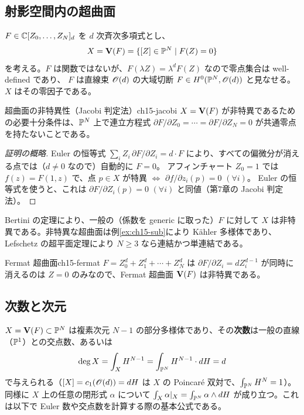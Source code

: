 \subsection{射影空間内の超曲面}

$F\in\mathbb{C}[Z_0,\dots,Z_N]_d$ を $d$ 次斉次多項式とし、
\[
X = \mathbf{V}(F) = \{[Z]\in\mathbb{P}^N\mid F(Z) = 0\}
\]
を考える。$F$ は関数ではないが、$F(\lambda Z) = \lambda^dF(Z)$ なので零点集合は well-defined であり、
$F$ は直線束 $\mathscr{O}(d)$ の大域切断 $F\in H^0(\mathbb{P}^N,\mathscr{O}(d))$ と見なせる。$X$ はその零因子である。

\begin{myprop}{超曲面の非特異性（Jacobi 判定法）}{ch15-jacobi}
$X = \mathbf{V}(F)$ が非特異であるための必要十分条件は、$\mathbb{P}^N$ 上で連立方程式
$\partial F/\partial Z_0 = \cdots = \partial F/\partial Z_N = 0$ が共通零点を持たないことである。
\end{myprop}

\begin{proof}[証明の概略]
Euler の恒等式 $\sum_iZ_i\,\partial F/\partial Z_i = d\cdot F$ により、すべての偏微分が消える点では（$d\neq0$ なので）自動的に $F=0$。
アフィンチャート $Z_0 = 1$ では $f(z) = F(1,z)$ で、点 $p\in X$ が特異 $\Leftrightarrow$ $\partial f/\partial z_i(p) = 0$ $(\forall i)$。
Euler の恒等式を使うと、これは $\partial F/\partial Z_i(p) = 0$ $(\forall i)$ と同値（第7章の Jacobi 判定法）。
\end{proof}

Bertini の定理により、一般の（係数を generic に取った）$F$ に対して $X$ は非特異である。非特異な超曲面は例\ref{ex:ch15-sub}により K\"ahler 多様体であり、
Lefschetz の超平面定理により $N\geq 3$ なら連結かつ単連結である。

\begin{myex}{Fermat 超曲面}{ch15-fermat}
$F = Z_0^d + Z_1^d + \cdots + Z_N^d$ は $\partial F/\partial Z_i = dZ_i^{d-1}$ が同時に消えるのは $Z=0$ のみなので、Fermat 超曲面 $\mathbf{V}(F)$ は非特異である。
\end{myex}

\subsection{次数と次元}

$X = \mathbf{V}(F)\subset\mathbb{P}^N$ は複素次元 $N-1$ の部分多様体であり、その\textbf{次数}は一般の直線（$\mathbb{P}^1$）との交点数、あるいは
\[
\deg X = \int_X H^{N-1} = \int_{\mathbb{P}^N}H^{N-1}\cdot dH = d
\]
で与えられる（$[X] = c_1(\mathscr{O}(d)) = dH$ は $X$ の Poincar\'e 双対で、$\int_{\mathbb{P}^N}H^N = 1$）。
同様に $X$ 上の任意の閉形式 $\alpha$ について $\int_X\alpha|_X = \int_{\mathbb{P}^N}\alpha\wedge dH$ が成り立つ。これは以下で Euler 数や交点数を計算する際の基本公式である。

